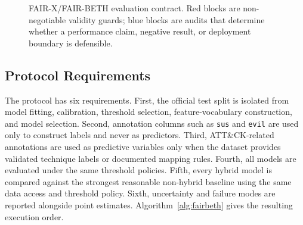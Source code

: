 \documentclass[journal]{IEEEtran}
\begin{document}
\begin{figure}[t]
{
}
\caption{FAIR-X/FAIR-BETH evaluation contract. Red blocks are non-negotiable validity guards; blue blocks are audits that determine whether a performance claim, negative result, or deployment boundary is defensible.}
\label{fig:fairx_protocol}
\end{figure}

\subsection{Protocol Requirements}

The protocol has six requirements. First, the official test split is isolated from model fitting, calibration, threshold selection, feature-vocabulary construction, and model selection. Second, annotation columns such as \texttt{sus} and \texttt{evil} are used only to construct labels and never as predictors. Third, ATT\&CK-related annotations are used as predictive variables only when the dataset provides validated technique labels or documented mapping rules. Fourth, all models are evaluated under the same threshold policies. Fifth, every hybrid model is compared against the strongest reasonable non-hybrid baseline using the same data access and threshold policy. Sixth, uncertainty and failure modes are reported alongside point estimates. Algorithm~\ref{alg:fairbeth} gives the resulting execution order.
\end{document}
